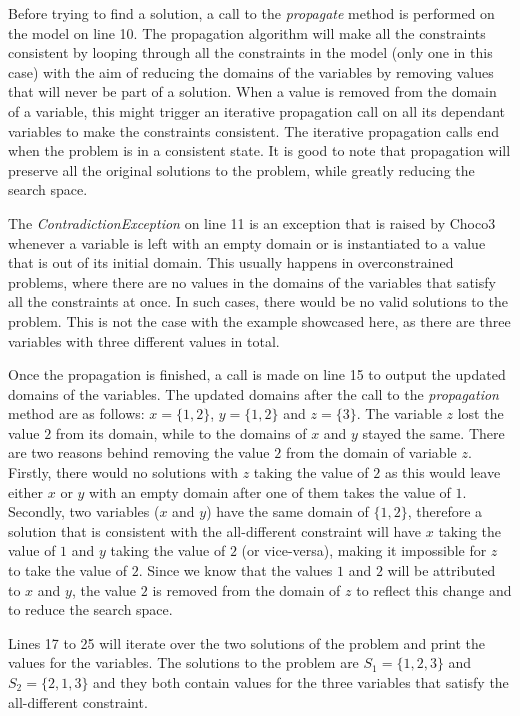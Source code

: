 \documentclass{l4proj}
\begin{document}
\noindent Before trying to find a solution, a call to the \textit{propagate} method is performed on the model on line 10. The propagation algorithm will make all the constraints consistent by looping through all the constraints in the model (only one in this case) with the aim of reducing the domains of the variables by removing values that will never be part of a solution. When a value is removed from the domain of a variable, this might trigger an iterative propagation call on all its dependant variables to make the constraints consistent. The iterative propagation calls end when the problem is in a consistent state. It is good to note that propagation will preserve all the original solutions to the problem, while greatly reducing the search space.

\noindent The \textit{ContradictionException} on line 11 is an exception that is raised by Choco3 whenever a variable is left with an empty domain or is instantiated to a value that is out of its initial domain. This usually happens in overconstrained problems, where there are no values in the domains of the variables that satisfy all the constraints at once. In such cases, there would be no valid solutions to the problem. This is not the case with the example showcased here, as there are three variables with three different values in total.

\noindent Once the propagation is finished, a call is made on line 15 to output the updated domains of the variables. The updated domains after the call to the \textit{propagation} method are as follows: $x = \{1, 2\}$, $y = \{1, 2\}$ and $z = \{3\}$. The variable $z$ lost the value $2$ from its domain, while to the domains of $x$ and $y$ stayed the same. There are two reasons behind removing the value $2$ from the domain of variable $z$. Firstly, there would no solutions with $z$ taking the value of $2$ as this would leave either $x$ or $y$ with an empty domain after one of them takes the value of $1$. Secondly, two variables ($x$ and $y$) have the same domain of $\{1, 2\}$, therefore a solution that is consistent with the all-different constraint will have $x$ taking the value of $1$ and $y$ taking the value of $2$ (or vice-versa), making it impossible for $z$ to take the value of $2$.  Since we know that the values $1$ and $2$ will be attributed to $x$ and $y$, the value $2$ is removed from the domain of $z$ to reflect this change and to reduce the search space.

\noindent Lines 17 to 25 will iterate over the two solutions of the problem and print the values for the variables. The solutions to the problem are $S_1 = \{1, 2, 3\}$ and $S_2 = \{2, 1, 3\}$ and they both contain values for the three variables that satisfy the all-different constraint.
\end{document}
